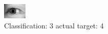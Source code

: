 \begin{figure}[h!]
\begin{center}
\includegraphics[width=0.60\columnwidth]{figures/ID3156_class_3_target_4.png}
\end{center}
\caption{ Classification: 3 actual target: 4}
\label{fig:ID3156_class_3_target_4}
\end{figure}
